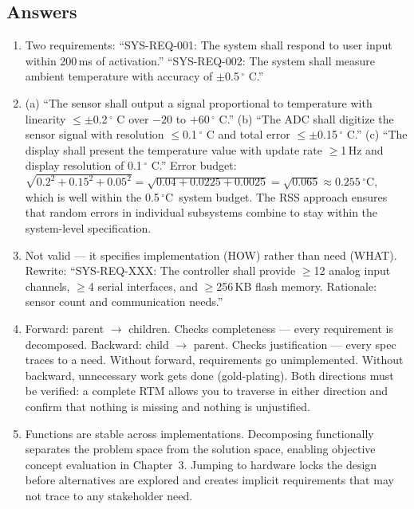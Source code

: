 \documentclass[11pt,letterpaper,twoside,openany]{book}
\newcommand{\degC}{\ensuremath{{}^{\circ}\text{C}}}
\begin{document}
\subsection{Answers}
\begin{enumerate}[leftmargin=1.5em]
\item Two requirements: ``SYS-REQ-001: The system shall respond to user input within 200\,ms of activation.'' ``SYS-REQ-002: The system shall measure ambient temperature with accuracy of $\pm$0.5\,$^{\circ}$ C.''
\item (a) ``The sensor shall output a signal proportional to temperature with linearity $\leq \pm$0.2\,$^{\circ}$ C over $-20$ to $+60$\,$^{\circ}$ C.'' (b) ``The ADC shall digitize the sensor signal with resolution $\leq$0.1\,$^{\circ}$ C and total error $\leq \pm$0.15\,$^{\circ}$ C.'' (c) ``The display shall present the temperature value with update rate $\geq$1\,Hz and display resolution of 0.1\,$^{\circ}$ C.'' Error budget: $\sqrt{0.2^2 + 0.15^2 + 0.05^2} = \sqrt{0.04 + 0.0225 + 0.0025} = \sqrt{0.065} \approx 0.255$\,\degC, which is well within the 0.5\,\degC\ system budget. The RSS approach ensures that random errors in individual subsystems combine to stay within the system-level specification.
\item Not valid --- it specifies implementation (HOW) rather than need (WHAT). Rewrite: ``SYS-REQ-XXX: The controller shall provide $\geq$12 analog input channels, $\geq$4 serial interfaces, and $\geq$256\,KB flash memory. Rationale: sensor count and communication needs.''
\item Forward: parent $\to$ children. Checks completeness --- every requirement is decomposed. Backward: child $\to$ parent. Checks justification --- every spec traces to a need. Without forward, requirements go unimplemented. Without backward, unnecessary work gets done (gold-plating). Both directions must be verified: a complete RTM allows you to traverse in either direction and confirm that nothing is missing and nothing is unjustified.
\item Functions are stable across implementations. Decomposing functionally separates the problem space from the solution space, enabling objective concept evaluation in Chapter~3. Jumping to hardware locks the design before alternatives are explored and creates implicit requirements that may not trace to any stakeholder need.


\end{enumerate}
\end{document}
